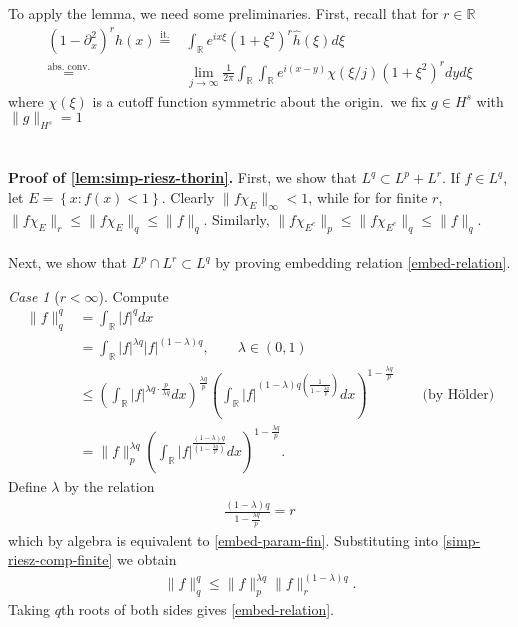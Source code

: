 \documentclass[12pt,reqno]{amsart}
\numberwithin{equation}{section}  %
\numberwithin{figure}{section}
\newcommand{\rr}{\mathbb{R}}
\newcommand{\wh}{\widehat}
\newcommand{\p}{\partial}
\theoremstyle{plain}
\theoremstyle{definition}
\theoremstyle{remark}
\newtheorem{case}{Case}
\begin{document}
%
%
%
To apply the lemma, we need some preliminaries. First, recall that for $r \in
\rr$
%
%
\begin{equation*}
\begin{split}
(1 - \p_x^{2})^{r}h(x) 
\overset{\text{it.}}{=} & \int_{\rr} e^{ix
\xi}(1 + \xi^{2})^{r} \wh{h}(\xi) d \xi
\\
\overset{\text{abs.\ conv.}}{=}  & \lim_{j \to \infty} \frac{1}{2 \pi} \int_{\rr}
\int_{\rr} e^{i(x-y)}
\chi( \xi/j) (1 + \xi^{2})^{r}dy d \xi
\end{split}
\end{equation*}
%
%
where $\chi(\xi)$ is a cutoff function symmetric about the origin.\ 
we fix $g \in H^{s}$ with $\| g\|_{H^{s}} = 1$
%
%
\appendix
\section{}
{\bf Proof of \autoref{lem:simp-riesz-thorin}.} 
%
First, we show that $L^q \subset L^p + L^r$. If $f \in L^q$, let $E = \left\{ x:
f(x) <1 \right\}$. Clearly $\|f \chi_{E}\|_{\infty} < 1$, while for for finite $r$, $\| f \chi_{E} \|_{r} \le \|f \chi_{E} \|_{q} \le \| f
\|_{q}$. Similarly, $\| f \chi_{E^c} \|_{p} \le \|f \chi_{E^c} \|_{q} \le \|f\|_{q}$. 
\\
\\
Next, we show that $L^{p} \cap L^{r} \subset L^{q}$ by proving embedding relation
\eqref{embed-relation}.
\begin{case}[$r < \infty$]
Compute
%
\begin{equation}
	\label{simp-riesz-comp-finite}
	\begin{split}
		\| f \|_{q}^{q}
		& = \int_{\rr} | f |^{q}dx
		\\
		& = \int_{\rr} | f |^{\lambda q} | f |^{(1-\lambda)q}, \qquad \lambda \in
		(0,1)
		\\
		& \le \left( \int_{\rr} | f |^{\lambda q \cdot \frac{p}{\lambda q}}dx
		\right)^{\frac{\lambda q}{p}}
		\left( \int_{\rr}| f |^{(1- \lambda)q \left(
		\frac{1}{1-\frac{\lambda q}{p}}
		\right)} dx \right)^{1- \frac{\lambda q}{p}} \qquad \text{(by H{\"o}lder)}
		\\
		& =\| f \|_{p}^{\lambda q} \left( \int_{\rr} | f |^{\frac{(1 -
		\lambda)q}{(1 - \frac{\lambda q}{p})}}dx \right)^{1- \frac{\lambda q}{p}}.
	\end{split}
\end{equation}
%
%
Define $\lambda$ by the relation	%
%
\begin{equation*}
	\begin{split}
		\frac{(1 - \lambda)q}{1 - \frac{\lambda q}{p}} = r
	\end{split}
\end{equation*}
%
%
which by algebra is equivalent to \eqref{embed-param-fin}.
%
%
%
%
%
Substituting into \eqref{simp-riesz-comp-finite} we obtain
%
%
\begin{equation*}
	\begin{split}
		\|f\|_{q}^{q} \le \| f \|_{p}^{\lambda q} \| f \|_{r}^{(1 - \lambda)q}.
	\end{split}
\end{equation*}
%
%
Taking $q$th roots of both sides gives \eqref{embed-relation}.
\end{case}	
\end{document}
